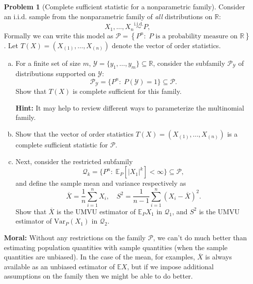 \documentclass{article}
\newcommand{\cP}{\mathcal{P}}
\newcommand{\cY}{\mathcal{Y}}
\newcommand{\cQ}{\mathcal{Q}}
\newcommand{\EE}{\mathbb{E}}
\newcommand{\PP}{\mathbb{P}}
\newcommand{\RR}{\mathbb{R}}
\newcommand{\simiid}{\overset{\text{i.i.d.}}{\sim}}
\newcommand{\optional}{{\bf Optional:} (Not graded, no extra points) }
\theoremstyle{definition}
\newtheorem{problem}{Problem}
\begin{document}
\begin{problem}[Complete sufficient statistic for a nonparametric family]

Consider an i.i.d. sample from the nonparametric family of {\em all} distributions on $\RR$:
\[
X_1,\ldots,X_n \simiid P,
\]
Formally we can write this model as $\cP = \left\{P^n:\; P \text{ is a probability measure on } \RR\right\}$. Let $T(X) = (X_{(1)},\ldots,X_{(n)})$ denote the vector of order statistics.

\begin{enumerate}[(a)]

\item For a finite set of size $m$, $\cY = \{y_1,\ldots,y_m\} \subseteq \RR$, consider the subfamily $\cP_\cY$ of distributions supported on $\cY$:
  \[
  \cP_\cY = \{P^n:\; P(\cY) = 1\} \subseteq \cP.
  \]
  Show that $T(X)$ is complete sufficient for this family.

{\bf Hint:}  It may help to review different ways to parameterize the multinomial family.



\item Show that the vector of order statistics $T(X) = (X_{(1)},\ldots,X_{(n)})$ is a complete sufficient statistic for $\cP$.



\item Next, consider the restricted subfamily 
\[
\cQ_k = \{P^n:\; \EE_P[|X_1|^k] < \infty\} \subseteq \cP,
\]
and define the sample mean and variance respectively as
\[
\overline X = \frac{1}{n}\sum_{i=1}^n X_i, \quad S^2 = \frac{1}{n-1} \sum_{i=1}^n (X_i - \overline X)^2.
\]
Show that $\overline X$ is the UMVU estimator of $\EE_P X_1$ in $\cQ_1$, and $S^2$ is the UMVU estimator of $\text{Var}_P(X_1)$ in $\cQ_2$.





% 

\end{enumerate}

{\bf Moral:} Without any restrictions on the family $\cP$, we can't do much better than estimating population quantities with sample quantities (when the sample quantities are unbiased). In the case of the mean, for examples, $\overline X$ is always available as an unbiased estimator of $\EE X$, but if we impose additional assumptions on the family then we might be able to do better.
\end{problem}



\end{document}
